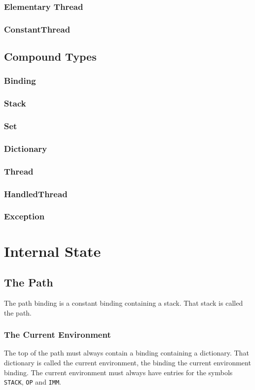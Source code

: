 \documentclass[a4paper]{article}
\begin{document}
\subsubsection{Elementary Thread}
\subsubsection{ConstantThread}

\subsection{Compound Types}
\subsubsection{Binding}
\subsubsection{Stack}
\subsubsection{Set}
\subsubsection{Dictionary}
\subsubsection{Thread}
\subsubsection{HandledThread}
\subsubsection{Exception}


\section{Internal State}
\subsection{The Path}
The path binding is a constant binding containing a stack. That stack is called
the path.
\subsubsection{The Current Environment}
The top of the path must always contain a binding containing a dictionary. That
dictionary is called the current environment, the binding the current
environment binding. The current environment must always have entries for the
symbols \texttt{STACK}, \texttt{OP} and \texttt{IMM}.
\end{document}
